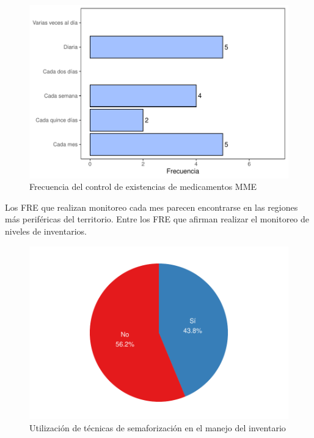 \documentclass[
]{book}
\begin{document}
\begin{figure}
\includegraphics[width=1\linewidth]{InformeFinal_files/figure-latex/FrecControlExistencias-1} \caption{Frecuencia del control de existencias de medicamentos MME}\label{fig:FrecControlExistencias}
\end{figure}

Los FRE que realizan monitoreo cada mes parecen encontrarse en las regiones más periféricas del territorio. Entre los FRE que afirman realizar el monitoreo de niveles de inventarios.

\begin{figure}
\includegraphics[width=0.85\linewidth]{InformeFinal_files/figure-latex/Semaforizacion-1} \caption{Utilización de técnicas de semaforización en el manejo del inventario}\label{fig:Semaforizacion}
\end{figure}
\end{document}
